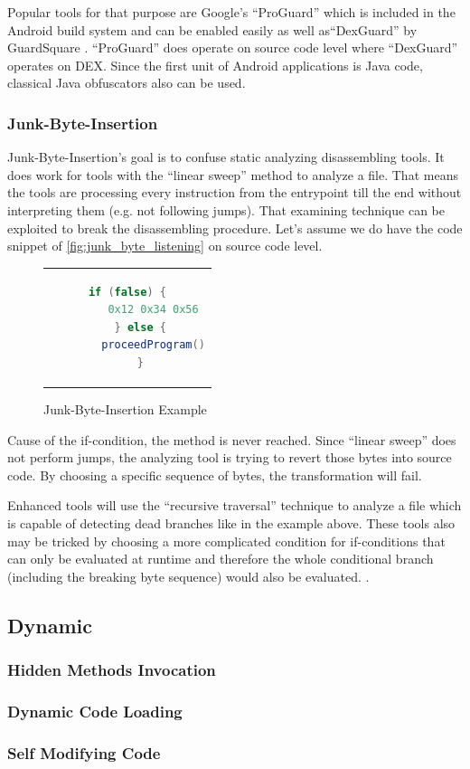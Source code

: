Popular tools for that purpose are Google's ``ProGuard''
\parencite{proguardtool} which is included in the Android build system and
can be enabled easily as well as``DexGuard'' by GuardSquare
\parencite{dexguardtool}. ``ProGuard'' does
operate on source code level where ``DexGuard'' operates on DEX.
Since the first unit of Android applications is Java code, classical Java
obfuscators also can be used.

\subsubsection{Junk-Byte-Insertion}
Junk-Byte-Insertion's goal is to confuse static analyzing
disassembling tools. It does work for tools with the
``linear sweep'' method to analyze a file. That means
the tools are processing every instruction from the entrypoint
till the end without interpreting them (e.g. not following jumps).
That examining technique can be exploited to break the disassembling
procedure. Let's assume we do have the code snippet of
\autoref{fig:junk_byte_listening}
on source code level.

\begin{figure}[htb]
  \centering
  \begin{tabular}{c}
  \begin{lstlisting}[language=Java]
    if (false) {
        0x12 0x34 0x56
    } else {
        proceedProgram()
    }
  \end{lstlisting}
  \end{tabular}
  \caption[Junk-Byte-Insertion]{Junk-Byte-Insertion Example}
  \label{fig:junk_byte_listening}
\end{figure}

Cause of the if-condition, the  method is never
reached. Since ``linear sweep'' does not perform jumps, the analyzing tool
is trying to revert those bytes into source code. By choosing a specific
sequence of bytes, the transformation will fail.

Enhanced tools will use the ``recursive traversal'' technique to analyze a
file which is capable of detecting dead branches like in the example above.
These tools also may be tricked by choosing a more complicated condition for
if-conditions that can only be evaluated at runtime and therefore the
whole conditional branch (including the breaking byte sequence) would also be evaluated.
\parencite{lvl_imp}.

\subsection{Dynamic}
\subsubsection{Hidden Methods Invocation}
\subsubsection{Dynamic Code Loading}
\subsubsection{Self Modifying Code}

